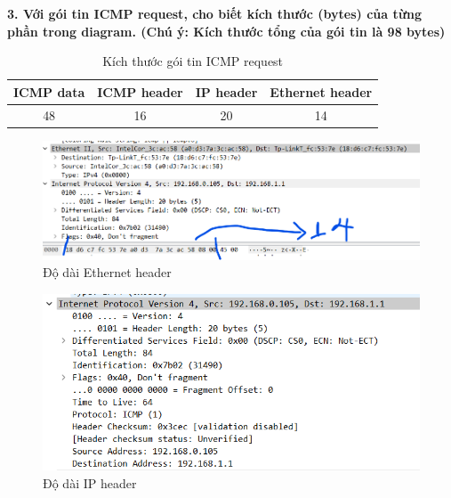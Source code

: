 \textbf{3.	Với gói tin ICMP request, cho biết kích thước (bytes) của từng phần trong diagram. (Chú ý: Kích thước tổng của gói tin là 98 bytes)}

\begin{table}[H]
\begin{center}
\begin{tabular}{|c|c|c|c|}
\hline 
ICMP data & ICMP header & IP header & Ethernet header \\ 
\hline 
48 & 16 & 20 & 14 \\ 
\hline 
\end{tabular} 
\end{center}
\caption{Kích thước gói tin ICMP request}
\end{table}

\begin{figure}[H]
\begin{center}
\includegraphics[scale=.8]{../figures/p1/p1_ethernet}
\end{center}
\caption{Độ dài Ethernet header}
\end{figure}

\begin{figure}[H]
\begin{center}
\includegraphics[scale=1]{../figures/p1/p1_ipheader}
\end{center}
\caption{Độ dài IP header}
\end{figure}

